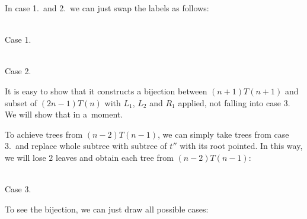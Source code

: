 \documentclass[final]{article}
\theoremstyle{definition}
\theoremstyle{definition}
\theoremstyle{remark}
\begin{document}
In case 1.~and 2.~we can just swap the labels as follows:

\begin{center}
    \begin{minipage}[t]{.3\textwidth}
        \begin{center}
            \\
            Case 1.
        \end{center}
    \end{minipage}%
    \begin{minipage}[t]{.3\textwidth}
        \begin{center}
            \\
            Case 2.
        \end{center}
    \end{minipage}%
\end{center}

It is easy to show that it constructs a bijection between \((n + 1) T(n + 1)\) and subset of \((2 n - 1) T(n)\) with \(L_1\), \(L_2\) and \(R_1\) applied, not falling into case 3. We will show that in a~moment.

To achieve trees from \((n - 2) T(n - 1)\), we can simply take trees from case 3.~and replace whole subtree with subtree of \(t''\) with its root pointed. In this way, we will lose \(2\) leaves and obtain each tree from \((n - 2) T(n - 1)\):

\begin{center}
    \begin{minipage}[t]{.3\textwidth}
        \begin{center}
            \\
            Case 3.
        \end{center}
    \end{minipage}%
\end{center}

To see the bijection, we can just draw all possible cases:
\end{document}
